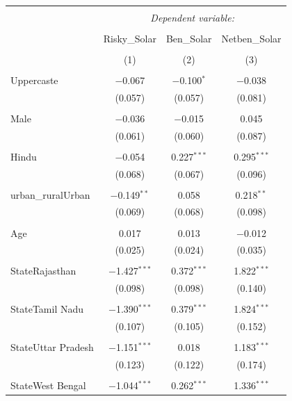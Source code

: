\documentclass[
]{article}
\begin{document}
\begin{table}[!htbp] \centering 
  \caption{} 
  \label{} 
\begin{tabular}{@{\extracolsep{5pt}}lccc} 
\\[-1.8ex]\hline 
\hline \\[-1.8ex] 
 & \multicolumn{3}{c}{\textit{Dependent variable:}} \\ 
\cline{2-4} 
\\[-1.8ex] & Risky\_Solar & Ben\_Solar & Netben\_Solar \\ 
\\[-1.8ex] & (1) & (2) & (3)\\ 
\hline \\[-1.8ex] 
 Uppercaste & $-$0.067 & $-$0.100$^{*}$ & $-$0.038 \\ 
  & (0.057) & (0.057) & (0.081) \\ 
  & & & \\ 
 Male & $-$0.036 & $-$0.015 & 0.045 \\ 
  & (0.061) & (0.060) & (0.087) \\ 
  & & & \\ 
 Hindu & $-$0.054 & 0.227$^{***}$ & 0.295$^{***}$ \\ 
  & (0.068) & (0.067) & (0.096) \\ 
  & & & \\ 
 urban\_ruralUrban & $-$0.149$^{**}$ & 0.058 & 0.218$^{**}$ \\ 
  & (0.069) & (0.068) & (0.098) \\ 
  & & & \\ 
 Age & 0.017 & 0.013 & $-$0.012 \\ 
  & (0.025) & (0.024) & (0.035) \\ 
  & & & \\ 
 StateRajasthan & $-$1.427$^{***}$ & 0.372$^{***}$ & 1.822$^{***}$ \\ 
  & (0.098) & (0.098) & (0.140) \\ 
  & & & \\ 
 StateTamil Nadu & $-$1.390$^{***}$ & 0.379$^{***}$ & 1.824$^{***}$ \\ 
  & (0.107) & (0.105) & (0.152) \\ 
  & & & \\ 
 StateUttar Pradesh & $-$1.151$^{***}$ & 0.018 & 1.183$^{***}$ \\ 
  & (0.123) & (0.122) & (0.174) \\ 
  & & & \\ 
 StateWest Bengal & $-$1.044$^{***}$ & 0.262$^{***}$ & 1.336$^{***}$ \\ 

\end{tabular}
\end{table}
\end{document}
